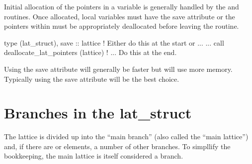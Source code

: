 Initial allocation of the pointers in a  variable is
generally handled by the  and 
routines.  Once allocated, local  variables must have
the save attribute or the pointers within must be appropriately
deallocated before leaving the routine.
\begin{example}
  type (lat_struct), save :: lattice     ! Either do this at the start or ...
  ...
  call deallocate_lat_pointers (lattice) ! ... Do this at the end.
\end{example}
Using the save attribute will generally be faster but will use more
memory. Typically using the save attribute will be the best choice.

\section{Branches in the lat_struct}
\label {s:lat.struct}

The lattice is divided up into the ``main branch'' 
(also called the ``main lattice'') and, if there are
 or  elements, a number of other branches. 
To simpllify the bookkeeping, the main lattice is itself considered a branch.

